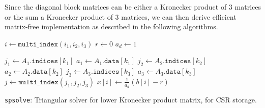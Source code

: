 Since the diagonal block matrices can be either a Kronecker product of 3 matrices or the sum a Kronecker product of 3 matrices, we can then derive efficient matrix-free implementation as described in the following algorithms.

\begin{algorithm}[ht]
\DontPrintSemicolon
\SetAlgoLined
{}
\BlankLine

   {
     {
       {
        $i \gets \texttt{multi\_index}(i_1, i_2, i_3)$ \; 
        $r \gets 0$ \; 
        $a_d \gets 1$ \; 

         {
          $j_1 \gets A_1.\texttt{indices}[k_1]$ \; 
          $a_1 \gets A_1.\texttt{data}[k_1]$ \; 
           {
            $j_2 \gets A_2.\texttt{indices}[k_2]$ \; 
            $a_2 \gets A_2.\texttt{data}[k_2]$ \; 
             {
              $j_3 \gets A_3.\texttt{indices}[k_3]$ \; 
              $a_3 \gets A_3.\texttt{data}[k_3]$ \; 
              $j \gets \texttt{multi\_index}(j_1, j_2, j_3)$ \; 
            }
          }
        }
        $x[i] \gets \frac{1}{a_d}(b[i] - r)$ \; 
      }
    }
  }

\caption{\texttt{spsolve}: Triangular solver for lower Kronecker product matrix, for CSR storage.}
\end{algorithm} 


